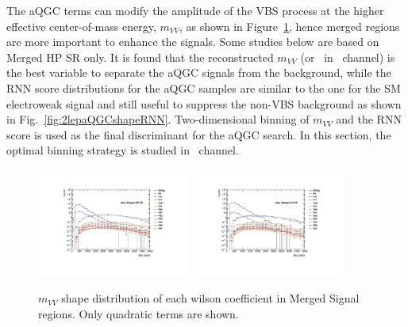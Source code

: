 The aQGC terms can modify the amplitude of the VBS process at the higher effective center-of-mass energy, 
$m_{VV}$, as shown in Figure~\ref{fig:2lepaQGCshapeMVV}, hence merged regions are more important to enhance the signals.
Some studies below are based on Merged HP SR only.
It is found that the reconstructed $m_{VV}$ (or \mt\ in \zlep\ channel) is the best variable to separate the aQGC signals from the background,
while the RNN score distributions for the aQGC samples are similar to the one for the SM electroweak signal and still useful to suppress the non-VBS background as shown in Fig.~\ref{fig:2lepaQGCshapeRNN}.
Two-dimensional binning of $m_{VV}$ and the RNN score is used as the final discriminant for the aQGC search.
In this section, the optimal binning strategy is studied in \tlep\ channel.

\begin{figure}[]
    \centering
   \includegraphics[width=0.45\textwidth]{figures/aQGC/MllJ_SR_HP_aQGC.pdf}
   \includegraphics[width=0.45\textwidth]{figures/aQGC/MllJ_SR_LP_aQGC.pdf}
    \caption{$m_{VV}$ shape distribution of each wilson coefficient in Merged Signal regions. Only quadratic terms are shown.}
    \label{fig:2lepaQGCshapeMVV}
\end{figure}

